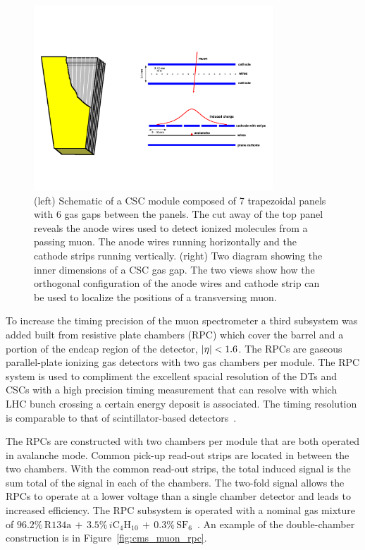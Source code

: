 \begin{figure}[htbp]
\centering
     \includegraphics[width=0.8\textwidth]{cms_and_lhc/plots/cms_muon_csc2.pdf}
     \caption{
(left) Schematic of a CSC module composed of 7 trapezoidal panels with 6 gas gaps between
the panels. The cut away of the top panel reveals the anode wires used to 
detect ionized molecules from a passing muon. The anode wires running horizontally and 
the cathode strips running vertically.
(right) Two diagram showing the inner dimensions of a CSC gas gap. The two views
show how the orthogonal configuration of the anode wires and cathode strip can be used
to localize the positions of a transversing muon.
     }
     \label{fig:cms_muon_csc}
\end{figure}

To increase the timing precision of the muon spectrometer a third subsystem was added
built from resistive plate chambers (RPC) which cover the barrel and a portion of the endcap
region of the detector, $\lvert\eta\rvert < 1.6$. The RPCs are gaseous parallel-plate ionizing gas 
detectors with two gas chambers per module. The RPC system is used to compliment the excellent spacial resolution of the
DTs and CSCs with a high precision timing measurement that can resolve with which LHC bunch
crossing a certain energy deposit is associated. The timing resolution is comparable
to that of scintillator-based detectors~\cite{rpc_dev}.

The RPCs are constructed with two chambers per module that are both operated in avalanche mode.
Common pick-up read-out strips are located in between the two chambers. With the common
 read-out strips, the total induced signal is the sum total of the signal in each of the
chambers. The two-fold signal allows the RPCs to operate at a lower voltage than a single
chamber detector and leads to increased efficiency. 
The RPC subsystem is operated with a nominal gas mixture of 
$96.2\% \, \textrm{R134a} \, + \, 3.5\% \, i\textrm{C}_{4}\textrm{H}_{10} \, + \, 0.3\% \, \textrm{SF}_{6}$~\cite{CMS-Proposal}.
An example of the
double-chamber construction is in Figure~\ref{fig:cms_muon_rpc}.

